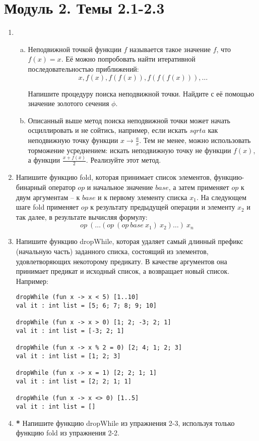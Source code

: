 \documentclass[a4paper,11pt]{article}
\begin{document}
\section*{Модуль 2. Темы 2.1-2.3}
\begin{enumerate}[{2-}1]
\item \begin{enumerate}[(a)]
\item Неподвижной точкой функции $f$ называется такое значение $f$, что 
$f(x) = x$. Её можно попробовать найти итеративной последовательностью
приближений:
\begin{equation*}
  x, f(x), f(f(x)), f(f(f(x))), \ldots
\end{equation*}

Напишите процедуру поиска неподвижной точки. Найдите с её помощью значение
золотого сечения $\phi$.

\item Описанный выше метод поиска неподвижной точки может начать осциллировать
и не сойтись, например, если искать $sqrt a$ как неподвижную точку функции
$x \rightarrow \frac{a}{x}$. Тем не менее, можно использовать торможение
усреднением: искать неподвижную точку не функции $f(x)$, а функции
$\frac{x+f(x)}{2}$. Реализуйте этот метод.
\end{enumerate}

\item Напишите функцию fold, которая принимает список элементов, 
функцию-бинарный оператор $op$ и начальное значение $base$, а затем применяет
$op$ к двум аргументам -- к $base$ и к первому элементу списка $x_1$. На
следующем шаге fold применяет $op$ к результату предыдущей операции и элементу
$x_2$ и так далее, в результате вычисляя формулу:
\begin{equation*}
  op~(\ldots (op~(op~base~x_1)~x_2) \ldots)~x_n
\end{equation*}

\item Напишите функцию dropWhile, которая удаляет самый длинный префикс
(начальную часть) заданного списка, состоящий из элементов, удовлетворяющих
некоторому предикату. В качестве аргументов она принимает предикат и исходный
список, а возвращает новый список. Например:

\begin{lstlisting}
dropWhile (fun x -> x < 5) [1..10]
val it : int list = [5; 6; 7; 8; 9; 10]

dropWhile (fun x -> x > 0) [1; 2; -3; 2; 1]
val it : int list = [-3; 2; 1]

dropWhile (fun x -> x % 2 = 0) [2; 4; 1; 2; 3]
val it : int list = [1; 2; 3]

dropWhile (fun x -> x = 1) [2; 2; 1; 1]
val it : int list = [2; 2; 1; 1]

dropWhile (fun x -> x <> 0) [1..5]
val it : int list = []
\end{lstlisting}

\item \textbf{*} Напишите функцию dropWhile из упражнения 2-3, используя только
функцию fold из упражнения 2-2.
\end{enumerate}
\end{document}
